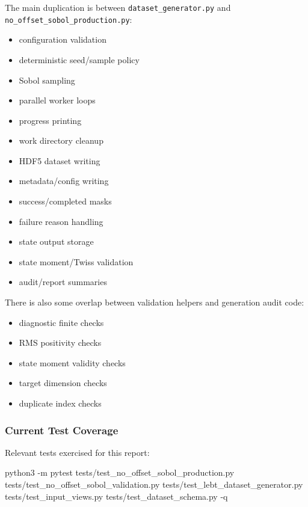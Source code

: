 \documentclass[
]{article}
\newenvironment{Shaded}{}{}
\newcommand{\NormalTok}[1]{#1}
\providecommand{\tightlist}{%
  \setlength{\itemsep}{0pt}\setlength{\parskip}{0pt}}
\begin{document}
The main duplication is between \texttt{dataset\_generator.py} and
\texttt{no\_offset\_sobol\_production.py}:

\begin{itemize}
\tightlist
\item
  configuration validation
\item
  deterministic seed/sample policy
\item
  Sobol sampling
\item
  parallel worker loops
\item
  progress printing
\item
  work directory cleanup
\item
  HDF5 dataset writing
\item
  metadata/config writing
\item
  success/completed masks
\item
  failure reason handling
\item
  state output storage
\item
  state moment/Twiss validation
\item
  audit/report summaries
\end{itemize}

There is also some overlap between validation helpers and generation
audit code:

\begin{itemize}
\tightlist
\item
  diagnostic finite checks
\item
  RMS positivity checks
\item
  state moment validity checks
\item
  target dimension checks
\item
  duplicate index checks
\end{itemize}

\hypertarget{current-test-coverage}{%
\subsubsection{Current Test Coverage}\label{current-test-coverage}}

Relevant tests exercised for this report:

\begin{Shaded}
\begin{Highlighting}[]
\NormalTok{python3 {-}m pytest tests/test\_no\_offset\_sobol\_production.py tests/test\_no\_offset\_sobol\_validation.py tests/test\_lebt\_dataset\_generator.py tests/test\_input\_views.py tests/test\_dataset\_schema.py {-}q}
\end{Highlighting}
\end{Shaded}
\end{document}
